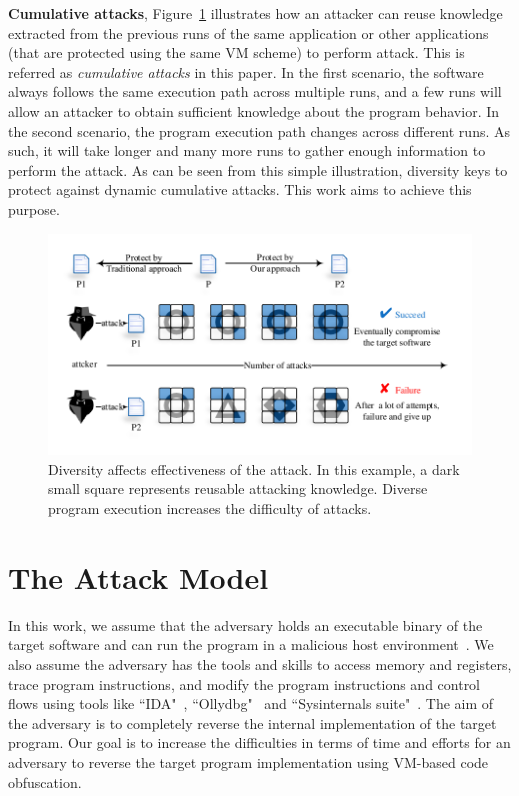 \documentclass[conference]{IEEEtran}
\begin{document}
\textbf{Cumulative attacks}, Figure~\ref{fig:Fig.1} illustrates how an attacker
can reuse knowledge extracted from the previous runs of the same application or
other applications (that are protected using the same VM scheme) to perform attack.
This is referred as \emph{cumulative attacks} in this paper.
In the first scenario, the software always follows the same execution path
across multiple runs, and a few runs will allow an attacker to
obtain sufficient knowledge about the program behavior. In the second
scenario, the program execution path changes across different runs. As such,
it will take longer and many more runs to gather enough information to
perform the attack. As can be seen from this simple illustration, diversity keys to
protect against dynamic cumulative attacks. This work aims to achieve this purpose.

\begin{figure}[t]%
    \centering
    \includegraphics[width=1.0\columnwidth]{figure/figone.pdf}
    \caption{Diversity affects effectiveness of the attack. In this example, a dark small square represents reusable attacking knowledge. Diverse program execution increases the difficulty of attacks.}\label{fig:Fig.1}
    \vspace{-5mm}
\end{figure}


\section{The Attack Model}
In this work, we assume that the adversary holds an executable binary of the
target software and can run the program in a malicious host
environment~\cite{11collberg2002watermarking}. We also assume the adversary
has the tools and skills to access memory and registers, trace program
instructions, and modify the program instructions and control flows using
tools like ``IDA"~\cite{14Idapro}, ``Ollydbg"~\cite{15Ollydbg} and
``Sysinternals suite"~\cite{16Sysinternalssuite}. The aim of the adversary is
to completely reverse the internal implementation of the target program.
Our goal is to increase the difficulties in terms of time and efforts for an adversary to
reverse the target program implementation using VM-based code obfuscation.
\end{document}
